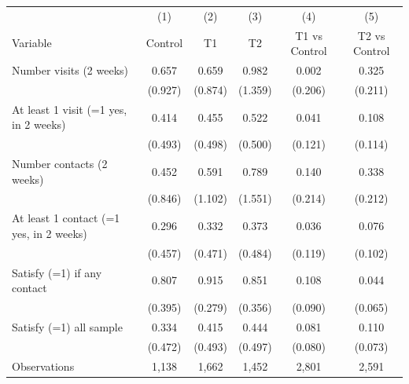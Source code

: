 \begin{tabular}{l*{5}c}
\hline\hline
 & (1) & (2) & (3) & (4) & (5) \\
Variable & Control & T1 & T2 & T1 vs Control & T2 vs Control \\
\hline
Number visits (2 weeks)&0.657&0.659&0.982&0.002&0.325\\
&(0.927)&(0.874)&(1.359)&(0.206)&(0.211)\\
At least 1 visit (=1 yes, in 2 weeks)&0.414&0.455&0.522&0.041&0.108\\
&(0.493)&(0.498)&(0.500)&(0.121)&(0.114)\\
Number contacts (2 weeks)&0.452&0.591&0.789&0.140&0.338\\
&(0.846)&(1.102)&(1.551)&(0.214)&(0.212)\\
At least 1 contact (=1 yes, in 2 weeks)&0.296&0.332&0.373&0.036&0.076\\
&(0.457)&(0.471)&(0.484)&(0.119)&(0.102)\\
Satisfy (=1) if any contact&0.807&0.915&0.851&0.108&0.044\\
&(0.395)&(0.279)&(0.356)&(0.090)&(0.065)\\
Satisfy (=1) all sample&0.334&0.415&0.444&0.081&0.110\\
&(0.472)&(0.493)&(0.497)&(0.080)&(0.073)\\
\hline
Observations & 1,138 & 1,662 & 1,452 & 2,801 & 2,591 \\
\hline\hline
\end{tabular}
